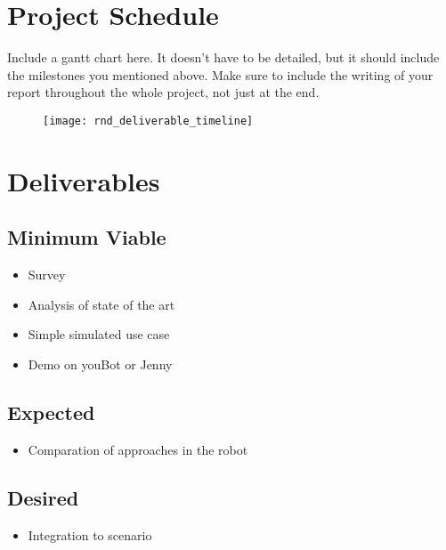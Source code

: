 \documentclass[rnd]{mas_proposal}
\begin{document}
\section{Project Schedule}
Include a gantt chart here. It doesn't have to be detailed, but it should include the milestones you mentioned above.
Make sure to include the writing of your report throughout the whole project, not just at the end.

\begin{figure}[h!]
    \texttt{[image: rnd\_deliverable\_timeline]}
    \caption{}
    \label{}
\end{figure}

\section{Deliverables}
\subsection{Minimum Viable}

\begin{itemize}
    \item Survey
    \item Analysis of state of the art
    \item Simple simulated use case
    \item Demo on youBot or Jenny
\end{itemize}

\subsection{Expected}
\begin{itemize}
    \item Comparation of approaches in the robot
\end{itemize}

\subsection{Desired}
\begin{itemize}
    \item Integration to scenario
\end{itemize}


\nocite{*}

\end{document}
